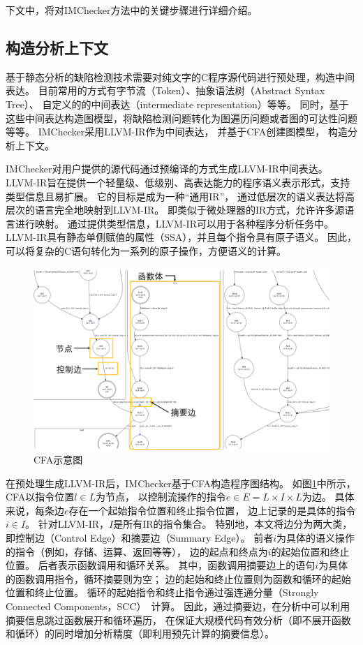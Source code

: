 下文中，将对IMChecker方法中的关键步骤进行详细介绍。

\subsection{构造分析上下文}
基于静态分析的缺陷检测技术需要对纯文字的C程序源代码进行预处理，构造中间表达。
目前常用的方式有字节流（Token）、抽象语法树（Abstract Syntax Tree）、
自定义的的中间表达（intermediate representation）等等。
同时，基于这些中间表达构造图模型，将缺陷检测问题转化为图遍历问题或者图的可达性问题等等。
IMChecker采用LLVM-IR作为中间表达，
并基于CFA创建图模型，
构造分析上下文。

IMChecker对用户提供的源代码通过预编译的方式生成LLVM-IR中间表达。
LLVM-IR旨在提供一个轻量级、低级别、高表达能力的程序语义表示形式，支持类型信息且易扩展。
它的目标是成为一种“通用IR”，
通过低层次的语义表达将高层次的语言完全地映射到LLVM-IR。
即类似于微处理器的IR方式，允许许多源语言进行映射。
通过提供类型信息，LLVM-IR可以用于各种程序分析任务中。
LLVM-IR具有静态单侧赋值的属性（SSA），并且每个指令具有原子语义。
因此，可以将复杂的C语句转化为一系列的原子操作，方便语义的计算。

\begin{figure}[t]
	\centering
	\includegraphics[width=0.7\linewidth]{figures/cp3-3-cfa.png}
	\caption{
		CFA示意图
	}
	\label{fig:3-3-cfa}
\end{figure}

在预处理生成LLVM-IR后，IMChecker基于CFA构造程序图结构。
如图\ref{fig:3-3-cfa}中所示，CFA以指令位置$l \in L$为节点，
以控制流操作的指令$e \in E = L \times I \times L$为边。
具体来说，每条边$e$存在一个起始指令位置和终止指令位置，
边上记录的是具体的指令$i \in I$。
针对LLVM-IR，$I$是所有IR的指令集合。
特别地，本文将边分为两大类，即控制边（Control Edge）和摘要边（Summary Edge）。
前者$i$为具体的语义操作的指令（例如，存储、运算、返回等等），
边的起点和终点为$i$的起始位置和终止位置。
后者表示函数调用和循环关系。
其中，函数调用摘要边上的语句$i$为具体的函数调用指令，循环摘要则为空；
边的起始和终止位置则为函数和循环的起始位置和终止位置。
循环的起始指令和终止指令通过强连通分量（Strongly Connected Components，SCC）~\cite{12-ele-scc}计算。
因此，通过摘要边，在分析中可以利用摘要信息跳过函数展开和循环遍历，
在保证大规模代码有效分析（即不展开函数和循环）的同时增加分析精度（即利用预先计算的摘要信息）。


